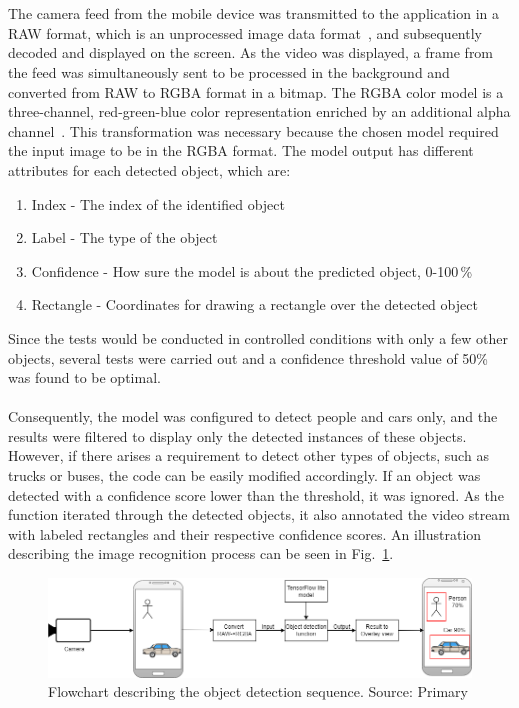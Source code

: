 \\ \\
The camera feed from the mobile device was transmitted to the application in a RAW format, which is an unprocessed image data format~\cite{Menasco2022MethodFormat}, and subsequently decoded and displayed on the screen. As the video was displayed, a frame from the feed was simultaneously sent to be processed in the background and converted from RAW to RGBA format in a bitmap. The RGBA color model is a three-channel, red-green-blue color representation enriched by an additional alpha channel~\cite{Menasco2022MethodFormat}. This transformation was necessary because the chosen model required the input image to be in the RGBA format.
The model output has different attributes for each detected object, which are:\\
\begin{enumerate}\itemsep0.3pt
    \item Index - The index of the identified object
    \item Label - The type of the object
    \item Confidence - How sure the model is about the predicted object, 0-100\,\%
    \item Rectangle - Coordinates for drawing a rectangle over the detected object\\
\end{enumerate}
Since the tests would be conducted in controlled conditions with only a few other objects, several tests were carried out and a confidence threshold value of 50\% was found to be optimal.
\\ \\
Consequently, the model was configured to detect people and cars only, and the results were filtered to display only the detected instances of these objects. However, if there arises a requirement to detect other types of objects, such as trucks or buses, the code can be easily modified accordingly. If an object was detected with a confidence score lower than the threshold, it was ignored. As the function iterated through the detected objects, it also annotated the video stream with labeled rectangles and their respective confidence scores. An illustration describing the image recognition process can be seen in Fig.~\ref{fig:Objectdetection-flowchart}.

\begin{figure}[H]
    \centering
    \includegraphics[scale=0.45]{figure/object_detection_illustration.png}
    \caption{Flowchart describing the object detection sequence. Source: Primary}
    \label{fig:Objectdetection-flowchart}
\end{figure}

